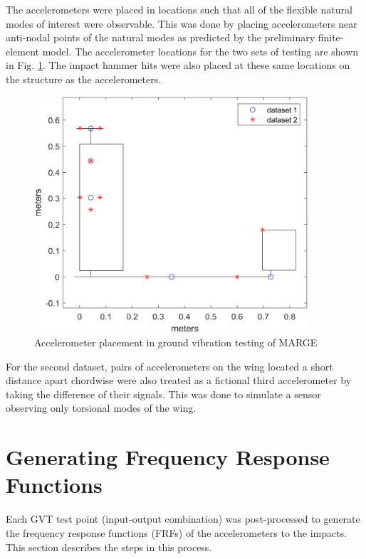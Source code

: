 The accelerometers were placed in locations such that all of the flexible natural modes of interest were observable. This was done by placing accelerometers near anti-nodal points of the natural modes as predicted by the preliminary finite-element model. The accelerometer locations for the two sets of testing are shown in Fig. \ref{fig:accelPlacement}. The impact hammer hits were also placed at these same locations on the structure as the accelerometers.

\begin{figure}[h]
    \centering
    \includegraphics[width=4in]{figs/GVT/accelLocPlot.png}
    \caption{Accelerometer placement in ground vibration testing of MARGE}
    \label{fig:accelPlacement}
\end{figure}

For the second dataset, pairs of accelerometers on the wing located a short distance apart chordwise were also treated as a fictional third accelerometer by taking the difference of their signals. This was done to simulate a sensor observing only torsional modes of the wing.

\section{Generating Frequency Response Functions} %

Each GVT test point (input-output combination) was post-processed to generate the frequency response functions (FRFs) of the accelerometers to the impacts. This section describes the steps in this process.

